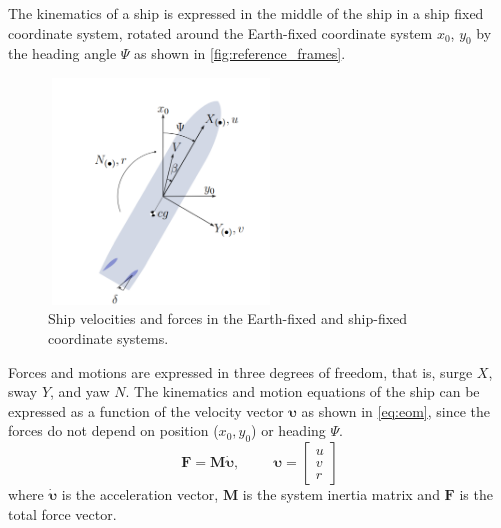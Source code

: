 \noindent The kinematics of a ship is expressed in the middle of the ship in a ship fixed coordinate system, rotated around the Earth-fixed coordinate system $x_0$, $y_0$ by the heading angle $\Psi$ as shown in \autoref{fig:reference_frames}. 
\begin{figure}[h!]
    \centering
    \includegraphics[width=6cm, height=6cm]{figures/reference_frames.png}
    \caption{Ship velocities and forces in the Earth-fixed and ship-fixed coordinate systems.}
    \label{fig:reference_frames}
\end{figure}
Forces and motions are expressed in three degrees of freedom, that is, surge $X$, sway $Y$, and yaw $N$. 
The kinematics and motion equations of the ship can be expressed as a function of the velocity vector $\pmb{\upsilon}$ as shown in \autoref{eq:eom}, since the forces do not depend on position ($x_0,y_0$) or heading $\Psi$.
\begin{equation}
    \label{eq:eom}
    \mathbf{F} = \mathbf{M}  \pmb{\dot{\upsilon}}, \hspace{1cm}
    \pmb{\upsilon} = \left[\begin{matrix}u\\v\\r\end{matrix}\right]
\end{equation}
where $\pmb{\dot{\upsilon}}$ is the acceleration vector, $\mathbf{M}$ is the system inertia matrix and $\mathbf{F}$ is the total force vector.
